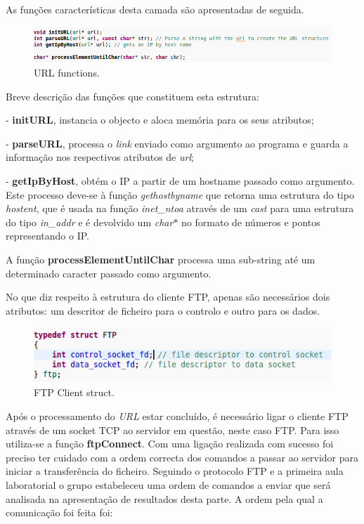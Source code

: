 \documentclass[a4paper]{article}
\begin{document}
As funções características desta camada são apresentadas de seguida.
\pagebreak

\begin{figure}[h!]
\includegraphics[scale=0.5]{res/url-functions.png}
\caption{URL functions.}
\end{figure}

Breve descrição das funções que constituem esta estrutura:

- \textbf{initURL}, instancia o objecto e aloca memória para os seus atributos;

- \textbf{parseURL}, processa o \textit{link} enviado como argumento ao programa e guarda a informação nos respectivos atributos de \textit{url};

- \textbf{getIpByHost}, obtém o IP a partir de um hostname passado como argumento. Este processo deve-se à função \textit{gethostbyname} que retorna uma estrutura do tipo \textit{hostent}, que é usada na função \textit{inet\_ntoa} através de um \textit{cast} para uma estrutura do tipo \textit{in\_addr} e é devolvido um \textit{char$*$} no formato de números e pontos representando o IP.

A função \textbf{processElementUntilChar} processa uma sub-string até um determinado caracter passado como argumento.\linebreak

No que diz respeito à estrutura do cliente FTP, apenas são necessários dois atributos: um descritor de ficheiro para o controlo e outro para os dados.

\begin{figure}[h!]
\includegraphics[scale=0.5]{res/ftp-struct.png}
\caption{FTP Client struct.}
\end{figure}

Após o processamento do \textit{URL} estar concluído, é necessário ligar o cliente FTP através de um socket TCP ao servidor em questão, neste caso FTP. Para isso utiliza-se a função \textbf{ftpConnect}. Com uma ligação realizada com sucesso foi preciso ter cuidado com a ordem correcta dos comandos a passar ao servidor para iniciar a transferência do ficheiro. Seguindo o protocolo FTP e a primeira aula laboratorial o grupo estabeleceu uma ordem de comandos a enviar que será analisada na apresentação de resultados desta parte. A ordem pela qual a comunicação foi feita foi:
\end{document}
